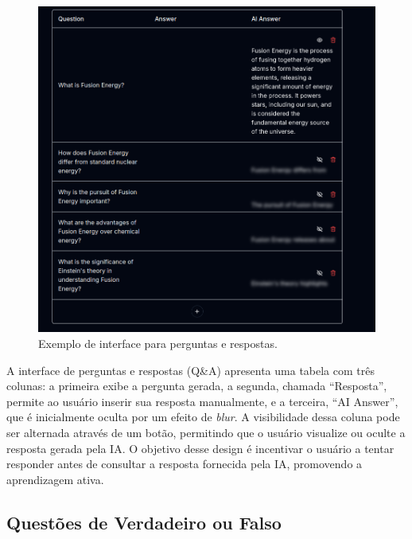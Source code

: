 \documentclass[tcc,capa]{texufpel}
\begin{document}
\begin{figure}[H]
\centering
\includegraphics[width=\textwidth,height=0.45\textheight,keepaspectratio]{exemplo-slides/graphics/images/q_a.png}
\caption{Exemplo de interface para perguntas e respostas.}
\label{fig:qa_interface}
\end{figure}

A interface de perguntas e respostas (Q\&A) apresenta uma tabela com três colunas: a primeira exibe a pergunta gerada, a segunda, chamada ``Resposta'', permite ao usuário inserir sua resposta manualmente, e a terceira, ``AI Answer'', que é inicialmente oculta por um efeito de \textit{blur}. A visibilidade dessa coluna pode ser alternada através de um botão, permitindo que o usuário visualize ou oculte a resposta gerada pela IA. O objetivo desse design é incentivar o usuário a tentar responder antes de consultar a resposta fornecida pela IA, promovendo a aprendizagem ativa.


\subsection{Questões de Verdadeiro ou Falso}
\end{document}
